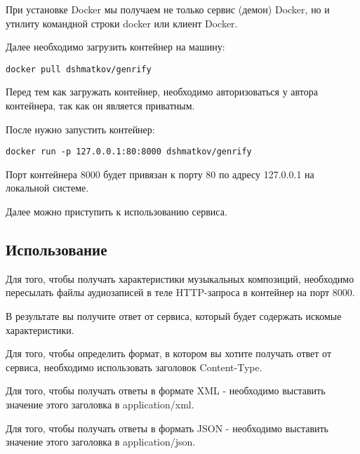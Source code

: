 При установке Docker мы получаем не только сервис (демон) Docker, но и утилиту командной строки docker или клиент Docker.

Далее необходимо загрузить контейнер на машину:
\begin{lstlisting}
docker pull dshmatkov/genrify
\end{lstlisting}

Перед тем как загружать контейнер, необходимо авторизоваться у автора контейнера, так как он является приватным.

После нужно запустить контейнер:
\begin{lstlisting}
docker run -p 127.0.0.1:80:8000 dshmatkov/genrify
\end{lstlisting}

Порт контейнера 8000 будет привязан к порту 80 по адресу 127.0.0.1 на локальной системе.

Далее можно приступить к использованию сервиса.

\subsection{Использование}
\label{sec:manual:usage}

Для того, чтобы получать характеристики музыкальных композиций, необходимо пересылать файлы аудиозаписей в теле HTTP-запроса в контейнер на порт 8000.

В результате вы получите ответ от сервиса, который будет содержать искомые характеристики.

Для того, чтобы определить формат, в котором вы хотите получать ответ от сервиса, необходимо использовать заголовок Content-Type.

Для того, чтобы получать ответы в формате XML - необходимо выставить значение этого заголовка в application/xml.

Для того, чтобы получать ответы в формать JSON - необходимо выставить значение этого заголовка в application/json.
